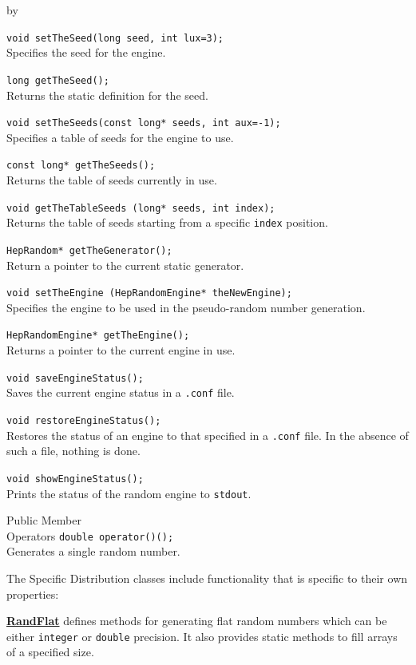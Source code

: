 \documentclass[twoside]{article}
\newcommand{\comp}[1]{\texttt{#1}}%
\newcommand{\entrylabel}[1]{\mbox{\textbf{{#1}}}\hfil}%
\newenvironment{entry}
{\begin{list}{}%
    {\renewcommand{\makelabel}{\entrylabel}%
     \setlength{\labelwidth}{90pt}%
     \setlength{\leftmargin}{\labelwidth}
     \advance\leftmargin by \labelsep%
      }%
    }%
  {\end{list}}
\newcommand{\Entrylabel}[1]%
{\raisebox{0pt}[1ex][0pt]{\makebox[\labelwidth][l]%
    {\parbox[t]{\labelwidth}{\hspace{0pt}\textbf{{#1}}}}}}
\newenvironment{Entry}%
{\renewcommand{\entrylabel}{\Entrylabel}\begin{entry}}%
  {\end{entry}}
\begin{document}
\begin{Entry}
    \verb+void setTheSeed(long seed, int lux=3);+\\
    Specifies the seed for the engine.

    \verb+long getTheSeed();+\\
    Returns the static definition for the seed.

    \verb+void setTheSeeds(const long* seeds, int aux=-1);+\\
    Specifies a table of seeds for the engine to use.

    \verb+const long* getTheSeeds();+\\
    Returns the table of seeds currently in use.

    \verb+void getTheTableSeeds (long* seeds, int index);+\\
    Returns the table of seeds starting from a specific \comp{index}
    position.

    \verb+HepRandom* getTheGenerator();+\\
    Return a pointer to the current static generator.

    \verb+void setTheEngine (HepRandomEngine* theNewEngine);+\\
    Specifies the engine to be used in the pseudo-random number generation.

    \verb+HepRandomEngine* getTheEngine();+\\
    Returns a pointer to the current engine in use.

    \verb+void saveEngineStatus();+\\
    Saves the current engine status in a \comp{.conf} file.
    
    \verb+void restoreEngineStatus();+\\
    Restores the status of an engine to that specified in
    a \comp{.conf} file.  In the absence of such a file,
    nothing is done.

    \verb+void showEngineStatus();+\\
    Prints the status of the random engine to \comp{stdout}.
        
\item[Public Member\\ Operators]
    \verb+double operator()();+\\
    Generates a single random number.
  
    The Specific Distribution classes include functionality that is specific
    to their own properties:
    
    \begin{description}
      \item \underline{\bf RandFlat}  defines methods for generating flat random numbers
        which can be either \comp{integer} or \comp{double} precision.
        It also provides static methods to fill arrays of a specified size.
    \end{description}
    

\end{Entry}
\end{document}

